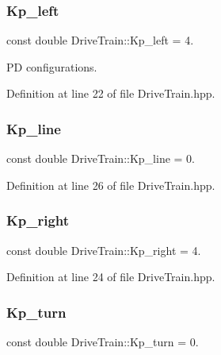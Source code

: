 \subsubsection{\texorpdfstring{Kp\+\_\+left}{Kp\_left}}
{\footnotesize\ttfamily const double Drive\+Train\+::\+Kp\+\_\+left = 4.\hspace{0.3cm}{\ttfamily [private]}}



PD configurations. 



Definition at line 22 of file Drive\+Train.\+hpp.

\mbox{\label{class_drive_train_a6edead09e2ecef2ce23bf6b45bcceebb}} 
\subsubsection{\texorpdfstring{Kp\+\_\+line}{Kp\_line}}
{\footnotesize\ttfamily const double Drive\+Train\+::\+Kp\+\_\+line = 0.\hspace{0.3cm}{\ttfamily [private]}}



Definition at line 26 of file Drive\+Train.\+hpp.

\mbox{\label{class_drive_train_a58317604093fb4fd0a29cce1d7a6c1b4}} 
\subsubsection{\texorpdfstring{Kp\+\_\+right}{Kp\_right}}
{\footnotesize\ttfamily const double Drive\+Train\+::\+Kp\+\_\+right = 4.\hspace{0.3cm}{\ttfamily [private]}}



Definition at line 24 of file Drive\+Train.\+hpp.

\mbox{\label{class_drive_train_a3500e2bb26c144a245f39d78b3fb5a8d}} 
\subsubsection{\texorpdfstring{Kp\+\_\+turn}{Kp\_turn}}
{\footnotesize\ttfamily const double Drive\+Train\+::\+Kp\+\_\+turn = 0.\hspace{0.3cm}{\ttfamily [private]}}



